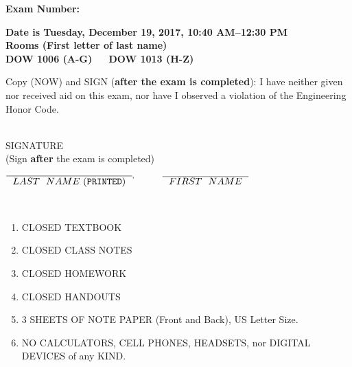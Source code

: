 \documentclass[letterpaper]{article}
\newcommand{\bline}[1]{\underline{\hspace*{#1}}}
\begin{document}

\begin{flushright}
{\bf Exam Number:}\bline{0.6in}
\end{flushright}

\vspace*{.1in}
\begin{center} %
\LARGE \bf
Date is Tuesday, December 19, 2017, 10:40 AM--12:30 PM \\
\large
Rooms (First letter of last name)\\
DOW 1006 (A-G)~~~DOW 1013 (H-Z) \\
\end{center}

\vspace*{0.5in}

 Copy (NOW) and SIGN ({\bf after the exam is completed}): I have neither given nor received aid on this exam, nor have I observed a violation of the
Engineering Honor Code.

\vspace*{1in}
\begin{flushright}
\underline{\hspace*{1.in}} \\
SIGNATURE \\
(Sign {\bf after} the exam is completed)
\end{flushright}

\vspace*{1in}

\begin{center}
$\overline{\mathrm ~~LAST~~NAME~ ({\tt PRINTED})~~}^, \hspace*{.4in} \overline{\mathrm ~~FIRST~~NAME~~}$ \\

\vspace*{2cm}

 \\

\end{center}

\vspace*{.45in} 
\begin{enumerate}
\item CLOSED TEXTBOOK
\item CLOSED CLASS NOTES
\item CLOSED HOMEWORK
\item CLOSED HANDOUTS
\item 3  SHEETS OF NOTE PAPER (Front and Back), US Letter Size.
\item NO CALCULATORS, CELL PHONES, HEADSETS, nor DIGITAL DEVICES of any KIND.
\end{enumerate}
\vspace*{.4in}
\end{document}
